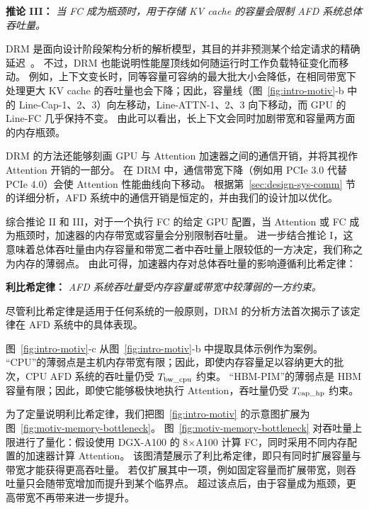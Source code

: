 \begin{mdframed}[backgroundcolor=gray!10,linecolor=black,linewidth=1pt]
\textbf{推论 III：}
\textit{当 FC 成为瓶颈时，用于存储 KV cache 的容量会限制 AFD 系统总体吞吐量。}
\end{mdframed}

DRM 是面向设计阶段架构分析的解析模型，其目的并非预测某个给定请求的精确延迟~\cite{stojkovic2025dynamoLLM,kakolyris2025throttllem}。
不过，DRM 也能说明性能屋顶线如何随运行时工作负载特征变化而移动。
例如，上下文变长时，同等容量可容纳的最大批大小会降低，在相同带宽下处理更大 KV cache 的吞吐量也会下降；因此，容量线（图~\ref{fig:intro-motiv}-b 中的 Line-Cap-1、2、3）向左移动，Line-ATTN-1、2、3 向下移动，而 GPU 的 Line-FC 几乎保持不变。
由此可以看出，长上下文会同时加剧带宽和容量两方面的内存瓶颈。

DRM 的方法还能够刻画 GPU 与 Attention 加速器之间的通信开销，并将其视作 Attention 开销的一部分。
在 DRM 中，通信带宽下降（例如用 PCIe 3.0 代替 PCIe 4.0）会使 Attention 性能曲线向下移动。
根据第~\ref{sec:design-sys-comm} 节的详细分析，AFD 系统中的通信开销是恒定的，并由我们的设计加以优化。

综合推论 II 和 III，对于一个执行 FC 的给定 GPU 配置，当 Attention 或 FC 成为瓶颈时，加速器的内存带宽或容量会分别限制吞吐量。
进一步结合推论 I，这意味着总体吞吐量由内存容量和带宽二者中吞吐量上限较低的一方决定，我们称之为内存的薄弱点。
由此可得，加速器内存对总体吞吐量的影响遵循利比希定律：

\begin{mdframed}[backgroundcolor=gray!10,linecolor=black,linewidth=1pt]
\textbf{利比希定律：}
\textit{AFD 系统吞吐量受内存容量或带宽中较薄弱的一方约束。}
\end{mdframed}
尽管利比希定律是适用于任何系统的一般原则，DRM 的分析方法首次揭示了该定律在 AFD 系统中的具体表现。

图~\ref{fig:intro-motiv}-c 从图~\ref{fig:intro-motiv}-b 中提取具体示例作为案例。
“CPU”的薄弱点是主机内存带宽有限；因此，即使内存容量足以容纳更大的批次，CPU AFD 系统的吞吐量仍受 $T_{\rm \text{bw\_cpu}}$ 约束。
“HBM-PIM”的薄弱点是 HBM 容量有限；因此，即使它能够极快地执行 Attention，吞吐量仍受 $T_{\rm \text{cap\_hp}}$ 约束。

为了定量说明利比希定律，我们把图~\ref{fig:intro-motiv} 的示意图扩展为图~\ref{fig:motiv-memory-bottleneck}。
图~\ref{fig:motiv-memory-bottleneck} 对吞吐量上限进行了量化：假设使用 DGX-A100 的 8$\times$A100 计算 FC，同时采用不同内存配置的加速器计算 Attention。
该图清楚展示了利比希定律，即只有同时扩展容量与带宽才能获得更高吞吐量。
若仅扩展其中一项，例如固定容量而扩展带宽，则吞吐量只会随带宽增加而提升到某个临界点。
超过该点后，由于容量成为瓶颈，更高带宽不再带来进一步提升。

